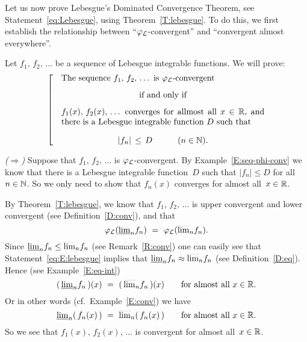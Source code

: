 \documentclass[main.tex]{subfiles}
\begin{document}
%
%
\begin{ex}
\label{E:lebesgue}
Let us now prove Lebesgue's Dominated Convergence Theorem,
 see Statement~\eqref{eq:Lebesgue}, 
using Theorem~\ref{T:lebesgue}.
To do this, we first establish the relationship between
``$\varphi_{\mathcal{L}}$-convergent'' and ``convergent almost everywhere''.

Let $f_1,\,f_2,\,\dotsc$ be a sequence of Lebesgue integrable functions.
We will prove:
\begin{equation}
\label{eq:E:lebesgue-0}
\left[\quad
\begin{minipage}{.7\columnwidth}
The sequence $f_1,\,f_2,\,\dotsc$
is $\Lphi$-convergent
\begin{center}
if and only if
\end{center}
 $f_1(x),\,f_2(x),\,\dotsc$ converges
for allmost all~$x\in \R$,
and
there is a Lebesgue integrable function~$D$
such that 
\begin{equation*}
|f_n|\,\leq\, D\qquad\quad(n\in\N).
\end{equation*}
\end{minipage}
\right.
\end{equation}

\vspace{.3em}
\emph{($\Longrightarrow$)}
Suppose that $f_1,\,f_2,\,\dotsc$
is $\varphi_{\mathcal{L}}$-convergent.
By Example~\ref{E:seq-phi-conv}
we know that there is a Lebesgue integrable function~$D$
such that $|f_n|\leq D$ for all~$n\in\mathbb{N}$.
So we only need to show that $f_n(x)$ 
converges for almost all~$x\in\mathbb{R}$.

By Theorem~\ref{T:lebesgue},
we know that $f_1,\,f_2,\,\dotsc$
is upper convergent and lower convergent
(see Definition~\ref{D:conv}),
and that 
\begin{equation}
\label{eq:E:lebesgue}
\varphi_{\mathcal{L}}(\smash{\underline{\lim}_{n}} f_n) \ =\  \varphi_{\mathcal{L}}(\smash{\overline{\lim}_{n}} f_n).
\end{equation}
Since $\smash{\underline{\lim}_{n}} f_n \leq \smash{\overline{\lim}_{n}} f_n$
(see Remark~\ref{R:conv})
one can easily see that Statement~\eqref{eq:E:lebesgue}
implies that 
 $\smash{\underline{\lim}_{n}} f_n \approx \smash{\overline{\lim}_{n}} f_n$
(see Definition~\ref{D:eq}).
Hence (see Example~\ref{E:eq-int})
\begin{equation*}
 (\,\smash{\underline{\lim}_{n}} f_n\,)(x) \ =\  (\,\smash{\overline{\lim}_{n}} f_n\,)(x)
\qquad\text{for almost all~$x\in \mathbb{R}$.}
\end{equation*}
Or in other words
(cf.~Example~\ref{E:conv}) we have
\begin{equation*}
 \smash{\underline{\lim}_{n}} (\,f_n(x)\,) \ =\  \smash{\overline{\lim}_{n}} (\,f_n(x)\,)
\qquad\text{for almost all~$x\in \mathbb{R}$.}
\end{equation*}
So we see that $f_1(x),\,f_2(x),\,\dotsc$
is convergent
for almost all~$x\in \mathbb{R}$.


\end{ex}
\end{document}
